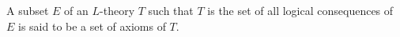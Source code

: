 A subset $E$ of an $L$-theory $T$ such that $T$ is the set of all logical consequences of $E$ is said to be a set of axioms of $T$.
